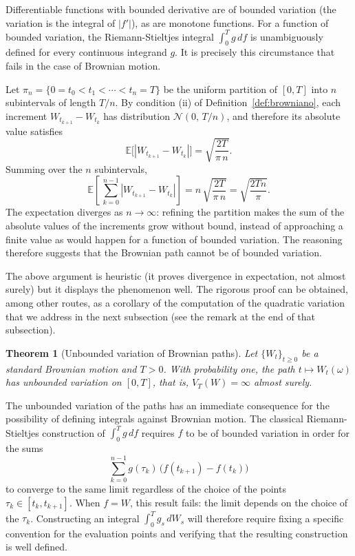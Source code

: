 \documentclass[11pt,a4paper,oneside]{report}
\theoremstyle{plain}
\newtheorem{teorema}{Theorem}[chapter]
\theoremstyle{definition}
\theoremstyle{remark}
\newcommand{\E}{\mathbb{E}}
\newcommand{\1}{\mathbf{1}}
\begin{document}
Differentiable functions with bounded derivative are of bounded
variation (the variation is the integral of $|f'|$), as are monotone
functions. For a function of bounded variation, the
Riemann-Stieltjes integral $\int_0^T g\, df$ is unambiguously defined
for every continuous integrand $g$. It is precisely this circumstance
that fails in the case of Brownian motion.

Let
$\pi_n = \{0 = t_0 < t_1 < \cdots < t_n = T\}$ be the uniform
partition of $[0, T]$ into $n$ subintervals of length $T/n$. By
condition (ii) of Definition~\ref{def:browniano}, each increment
$W_{t_{k+1}} - W_{t_k}$ has distribution $\mathcal{N}(0,\, T/n)$, and
therefore its absolute value satisfies
\begin{equation*}
  \E\bigl[|W_{t_{k+1}} - W_{t_k}|\bigr]
  = \sqrt{\frac{2T}{\pi\, n}}.
\end{equation*}
Summing over the $n$ subintervals,
\begin{equation*}
  \E\!\left[\,\sum_{k=0}^{n-1} |W_{t_{k+1}} - W_{t_k}|\right]
  = n\, \sqrt{\frac{2T}{\pi\, n}}
  = \sqrt{\frac{2 T n}{\pi}}.
\end{equation*}
The expectation diverges as $n \to \infty$: refining the partition
makes the sum of the absolute values of the increments grow without
bound, instead of approaching a finite value as would happen for a
function of bounded variation. The reasoning therefore suggests that
the Brownian path cannot be of bounded variation.

The above argument is heuristic (it proves divergence in expectation,
not almost surely) but it displays the phenomenon well. The
rigorous proof can be obtained, among other routes, as a corollary of
the computation of the quadratic variation that we address in the
next subsection (see the remark at the end of that subsection).

\begin{teorema}[Unbounded variation of Brownian paths]
\label{teo:variacion_no_acotada}
Let $\{W_t\}_{t \geq 0}$ be a standard Brownian motion and $T > 0$.
With probability one, the path $t \mapsto W_t(\omega)$ has unbounded
variation on $[0, T]$, that is, $V_T(W) = \infty$ almost surely.
\end{teorema}

The
unbounded variation of the paths has an immediate consequence for the
possibility of defining integrals against Brownian motion. The
classical Riemann-Stieltjes construction of $\int_0^T g\, df$ requires
$f$ to be of bounded variation in order for the sums
\begin{equation*}
  \sum_{k=0}^{n-1} g(\tau_k)\, \bigl(f(t_{k+1}) - f(t_k)\bigr)
\end{equation*}
to converge to the same limit regardless of the choice of the points
$\tau_k \in [t_k, t_{k+1}]$. When $f = W$, this result fails: the
limit depends on the choice of the $\tau_k$. Constructing an integral
$\int_0^T g_s\, dW_s$ will therefore require fixing a specific
convention for the evaluation points and verifying that the resulting
construction is well defined.
\end{document}
